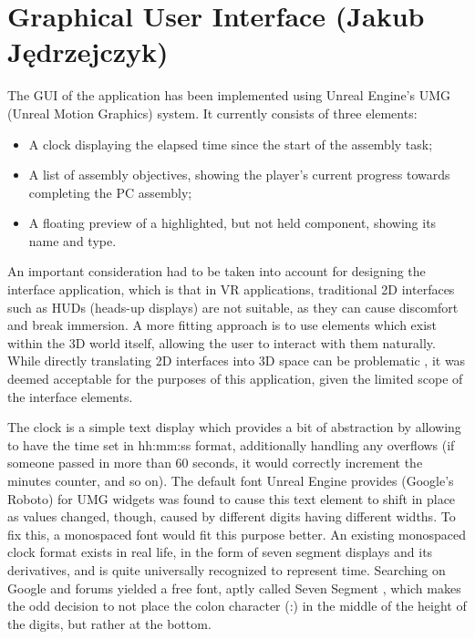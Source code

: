 \section{Graphical User Interface (Jakub Jędrzejczyk)}
\label{chap:GUI}

The GUI of the application has been implemented using Unreal Engine's UMG (Unreal Motion Graphics) system.
It currently consists of three elements:

\begin{itemize}
    \item A clock displaying the elapsed time since the start of the assembly task;
    \item A list of assembly objectives, showing the player's current progress towards completing the PC assembly;
    \item A floating preview of a highlighted, but not held component, showing its name and type.
\end{itemize}

An important consideration had to be taken into account for designing the interface application, which is that in VR applications, traditional 2D interfaces such as HUDs (heads-up displays) are not suitable, as they can cause discomfort and break immersion.
A more fitting approach is to use elements which exist within the 3D world itself, allowing the user to interact with them naturally.
While directly translating 2D interfaces into 3D space can be problematic \cite{mehmedovaVirtualRealityUser2025}, it was deemed acceptable for the purposes of this application, given the limited scope of the interface elements.

The clock is a simple text display which provides a bit of abstraction by allowing to have the time set in hh:mm:ss format, additionally handling any overflows (if someone passed in more than 60 seconds, it would correctly increment the minutes counter, and so on).
The default font Unreal Engine provides (Google's Roboto) for UMG widgets was found to cause this text element to shift in place as values changed, though, caused by different digits having different widths.
To fix this, a monospaced font would fit this purpose better.
An existing monospaced clock format exists in real life, in the form of seven segment displays \cite{SevensegmentDisplay2025} and its derivatives, and is quite universally recognized to represent time.
Searching on Google and forums \cite{thunderbar7SegmentLCD2024} yielded a free font, aptly called Seven Segment \cite{SevenSegmentFont}, which makes the odd decision to not place the colon character (:) in  the middle of the height of the digits, but rather at the bottom.

